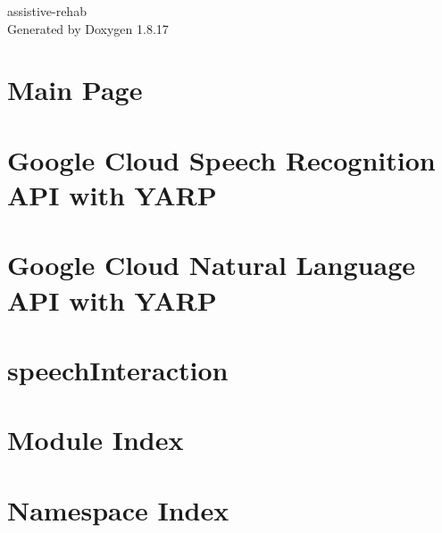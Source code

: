 \let\mypdfximage\pdfximage\def\pdfximage{\immediate\mypdfximage}\documentclass[twoside]{book}
\newcommand{\+}{\discretionary{\mbox{\scriptsize$\hookleftarrow$}}{}{}}
\newcommand{\clearemptydoublepage}{%
  \newpage{\pagestyle{empty}\cleardoublepage}%
}
\begin{document}
\begin{titlepage}
\vspace*{7cm}
\begin{center}%
{\Large assistive-\/rehab }\\
\vspace*{1cm}
{\large Generated by Doxygen 1.8.17}\\
\end{center}
\end{titlepage}
\clearemptydoublepage
{}
\tableofcontents
\clearemptydoublepage
{}

\chapter{Main Page}
\label{index}\hypertarget{index}{}
\chapter{Google Cloud Speech Recognition A\+PI with Y\+A\+RP}
\label{md__home_runner_work_assistive-rehab_assistive-rehab_gh-pages_modules_speechInteraction_modules_googleSpeech_README}

\chapter{Google Cloud Natural Language A\+PI with Y\+A\+RP}
\label{md__home_runner_work_assistive-rehab_assistive-rehab_gh-pages_modules_speechInteraction_modules_googleSpeechProcess_README}

\chapter{speech\+Interaction}
\label{md__home_runner_work_assistive-rehab_assistive-rehab_gh-pages_modules_speechInteraction_README}

\chapter{Module Index}

\chapter{Namespace Index}

\end{document}
